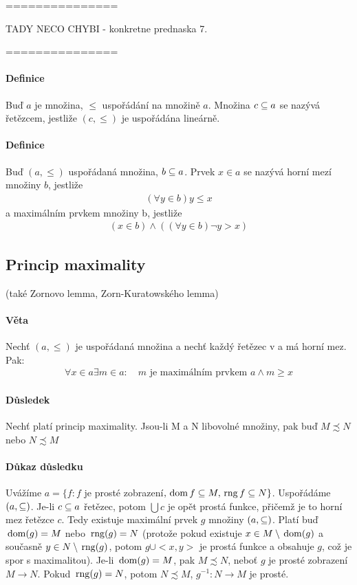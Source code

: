 \documentclass[a4paper,12pt,titlepage]{article}
\begin{document}
=============== 


TADY NECO CHYBI - konkretne prednaska 7.


===============


\paragraph{Definice}
Buď $a$ je množina, $\le$ uspořádání na množině $a$. Množina $c \subseteq a$ se nazývá
řetězcem, jestliže $(c, \le)$ je uspořádána lineárně.
\paragraph{Definice}
Buď $(a, \le)$ uspořádaná množina, $b \subseteq a$. Prvek $x \in a$ se nazývá horní
mezí množiny $b$, jestliže 
\begin{align}
	(\forall y \in b) y \le x
\end{align}
a maximálním prvkem množiny b, jestliže
\begin{align}
	(x \in b) \land ((\forall y \in b) \neg y > x)
\end{align}

\subsection{Princip maximality}
\setcounter{equation}{0}
(také Zornovo lemma, Zorn-Kuratowského lemma)
\paragraph{Věta}
Nechť $(a, \le)$ je uspořádaná množina a nechť každý řetězec v a má horní mez.
Pak:
\begin{align}
	\forall x \in a \exists m \in a: \quad m \text{ je maximálním prvkem } a
	\land m \ge x
\end{align}
\paragraph{Důsledek}
Nechť platí princip maximality. Jsou-li M a N libovolné množiny, pak buď $M
\precsim N$ nebo $N \precsim M$
\paragraph{Důkaz důsledku}
Uvážíme $a = \{ f: f$ je prosté zobrazení$, \operatorname*{\,dom} f \subseteq M, \operatorname*{\,rng} f \subseteq N
\}$. Uspořádáme $(a, \subseteq)$. Je-li $c \subseteq a$ řetězec, potom $\bigcup c$
je opět prostá funkce, přičemž je to horní mez řetězce $c$. Tedy existuje
maximální prvek $g$ množiny $(a,\subseteq)$. Platí buď $\operatorname*{\,dom}(g) = M$ nebo $\operatorname*{\,rng}(g) =
N$ (protože pokud existuje $x \in M \setminus \operatorname*{\,dom}(g)$ a současně $y \in N \setminus
\operatorname*{\,rng}(g)$, potom $g \cup <x,y>$ je prostá funkce a obsahuje $g$, což je spor s
maximalitou). Je-li $\operatorname*{\,dom}(g) = M$, pak $M \precsim N$, neboť $g$ je prosté
zobrazení $M \to N$. Pokud $\operatorname*{\,rng}(g) = N$, potom $N \precsim M$, $g^{-1}: N \to
M$ je prosté.
\end{document}
